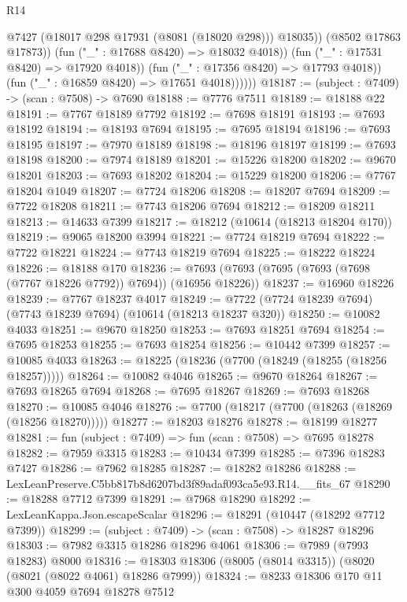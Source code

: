 \begin{lexlean}{R14}
\begin{coremodule}
                          @7427
                          (@18017 @298 @17931 (@8081 (@18020 @298)))
                          @18035))
                      (@8502 @17863 @17873))
                    (fun ("_" : @17688 @8420) => @18032 @4018))
                  (fun ("_" : @17531 @8420) => @17920 @4018))
                (fun ("_" : @17356 @8420) => @17793 @4018))
              (fun ("_" : @16859 @8420) => @17651 @4018))))))
@18187 := (subject : @7409) -> (scan : @7508) -> @7690
@18188 := @7776 @7511
@18189 := @18188 @22
@18191 := @7767 @18189 @7792
@18192 := @7698 @18191
@18193 := @7693 @18192
@18194 := @18193 @7694
@18195 := @7695 @18194
@18196 := @7693 @18195
@18197 := @7970 @18189
@18198 := @18196 @18197
@18199 := @7693 @18198
@18200 := @7974 @18189
@18201 := @15226 @18200
@18202 := @9670 @18201
@18203 := @7693 @18202
@18204 := @15229 @18200
@18206 := @7767 @18204 @1049
@18207 := @7724 @18206
@18208 := @18207 @7694
@18209 := @7722 @18208
@18211 := @7743 @18206 @7694
@18212 := @18209 @18211
@18213 := @14633 @7399
@18217 := @18212 (@10614 (@18213 @18204 @170))
@18219 := @9065 @18200 @3994
@18221 := @7724 @18219 @7694
@18222 := @7722 @18221
@18224 := @7743 @18219 @7694
@18225 := @18222 @18224
@18226 := @18188 @170
@18236 := @7693 (@7693 (@7695 (@7693 (@7698 (@7767 @18226 @7792)) @7694)) (@16956 @18226))
@18237 := @16960 @18226
@18239 := @7767 @18237 @4017
@18249 := @7722 (@7724 @18239 @7694) (@7743 @18239 @7694) (@10614 (@18213 @18237 @320))
@18250 := @10082 @4033
@18251 := @9670 @18250
@18253 := @7693 @18251 @7694
@18254 := @7695 @18253
@18255 := @7693 @18254
@18256 := @10442 @7399
@18257 := @10085 @4033
@18263 := @18225 (@18236 (@7700 (@18249 (@18255 (@18256 @18257)))))
@18264 := @10082 @4046
@18265 := @9670 @18264
@18267 := @7693 @18265 @7694
@18268 := @7695 @18267
@18269 := @7693 @18268
@18270 := @10085 @4046
@18276 := @7700 (@18217 (@7700 (@18263 (@18269 (@18256 @18270)))))
@18277 := @18203 @18276
@18278 := @18199 @18277
@18281 := fun (subject : @7409) => fun (scan : @7508) => @7695 @18278
@18282 := @7959 @3315
@18283 := @10434 @7399
@18285 := @7396 @18283 @7427
@18286 := @7962 @18285
@18287 := @18282 @18286
@18288 := LexLeanPreserve.C5bb817b8d6207bd3f89adaf093ca5e93.R14.__fits_67
@18290 := @18288 @7712 @7399
@18291 := @7968 @18290
@18292 := LexLeanKappa.Json.escapeScalar
@18296 := @18291 (@10447 (@18292 @7712 @7399))
@18299 := (subject : @7409) -> (scan : @7508) -> @18287 @18296
@18303 := @7982 @3315 @18286 @18296 @4061
@18306 := @7989 (@7993 @18283) @8000
@18316 := @18303 @18306 (@8005 (@8014 @3315)) (@8020 (@8021 (@8022 @4061) @18286 @7999))
@18324 := @8233 @18306 @170 @11 @300 @4059 @7694 @18278 @7512

\end{coremodule}
\end{lexlean}

